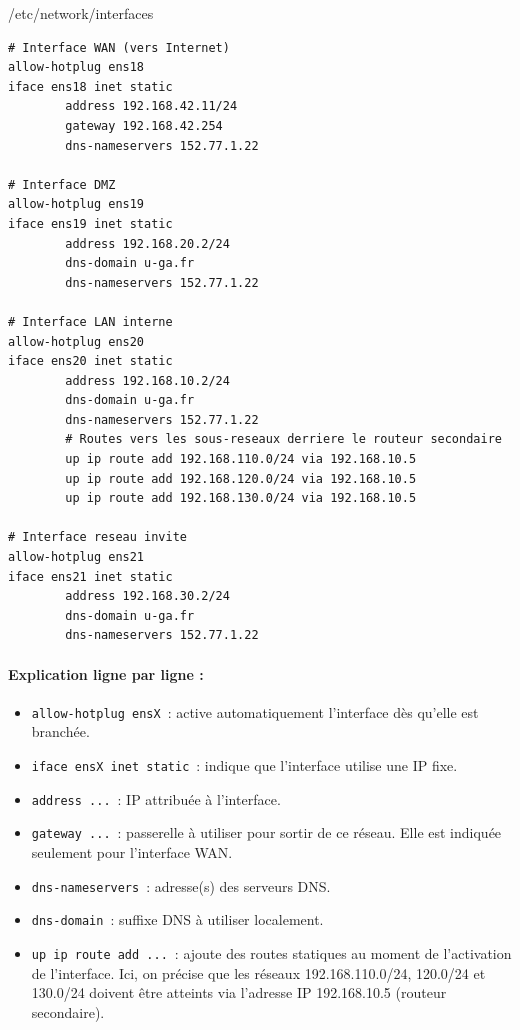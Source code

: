 \documentclass{article}
\begin{document}
\begin{configbox}{/etc/network/interfaces}
\begin{lstlisting}
# Interface WAN (vers Internet)
allow-hotplug ens18
iface ens18 inet static
        address 192.168.42.11/24
        gateway 192.168.42.254
        dns-nameservers 152.77.1.22

# Interface DMZ
allow-hotplug ens19
iface ens19 inet static
        address 192.168.20.2/24
        dns-domain u-ga.fr
        dns-nameservers 152.77.1.22

# Interface LAN interne
allow-hotplug ens20
iface ens20 inet static
        address 192.168.10.2/24
        dns-domain u-ga.fr
        dns-nameservers 152.77.1.22
        # Routes vers les sous-reseaux derriere le routeur secondaire
        up ip route add 192.168.110.0/24 via 192.168.10.5
        up ip route add 192.168.120.0/24 via 192.168.10.5
        up ip route add 192.168.130.0/24 via 192.168.10.5

# Interface reseau invite
allow-hotplug ens21
iface ens21 inet static
        address 192.168.30.2/24
        dns-domain u-ga.fr
        dns-nameservers 152.77.1.22
\end{lstlisting}
\end{configbox}

\paragraph{Explication ligne par ligne :}
\begin{itemize}
    \item \texttt{allow-hotplug ensX}~: active automatiquement l'interface dès qu'elle est branchée.
    \item \texttt{iface ensX inet static}~: indique que l’interface utilise une IP fixe.
    \item \texttt{address ...}~: IP attribuée à l’interface.
    \item \texttt{gateway ...}~: passerelle à utiliser pour sortir de ce réseau. Elle est indiquée seulement pour l'interface WAN.
    \item \texttt{dns-nameservers}~: adresse(s) des serveurs DNS.
    \item \texttt{dns-domain}~: suffixe DNS à utiliser localement.
    \item \texttt{up ip route add ...}~: ajoute des routes statiques au moment de l’activation de l’interface. Ici, on précise que les réseaux 192.168.110.0/24, 120.0/24 et 130.0/24 doivent être atteints via l'adresse IP 192.168.10.5 (routeur secondaire).
\end{itemize}
\end{document}
